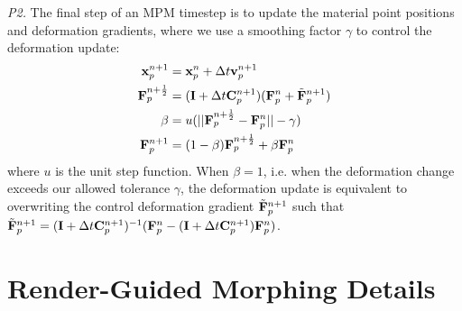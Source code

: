 \textit{P2.} The final step of an {MPM} timestep is to update the material point positions and deformation gradients, where we use a smoothing factor $\gamma$ to control the deformation update:
\begin{align}
    \mathbf{x}_{p} ^{n+1} & = \mathbf{x}_{p} ^{n} + \Delta t \mathbf{v}_{p} ^{n+1} \\
\label{sec:appendixA}
    \mathbf{F}_{p} ^{n+\frac{1}{2}} & = (\mathbf{I} + \Delta t \mathbf{C}_{p} ^{n+1}) (\mathbf{F}_{p} ^{n} + \tilde{\mathbf{F}}_{p} ^{n+1})\\
    \beta &= u(||\mathbf{F}_{p} ^{n+\frac{1}{2}} - \mathbf{F}_{p} ^{n}|| - \gamma)\\
    \mathbf{F}_{p} ^{n+1} &= (1 - \beta) \mathbf{F}_{p} ^{n+\frac{1}{2}} + \beta \mathbf{F}_{p} ^{n}
\end{align}
where $u$ is the unit step function. When $\beta = 1$, i.e. when the deformation change exceeds our allowed tolerance $\gamma$, the deformation update is equivalent to overwriting the control deformation gradient $\tilde{\mathbf{F}}_{p} ^{n+1}$ such that $\tilde{\mathbf{F}}_{p} ^{n+1} = (\mathbf{I} + \Delta t \mathbf{C}_{p} ^{n+1})^{-1} (\mathbf{F}_{p} ^{n} - (\mathbf{I} + \Delta t \mathbf{C}_{p} ^{n+1}) \mathbf{F}_{p} ^{n})$.

\setlength{\emergencystretch}{1.5em}

\clearpage
\chapter{Render-Guided Morphing Details}
\label{app:ch4}

\renewcommand{\theequation}{\thechapter.\arabic{equation}}
\setcounter{equation}{0}

